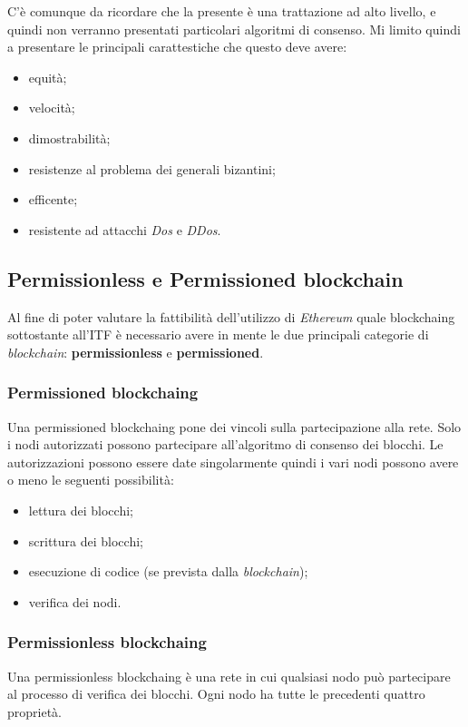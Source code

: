 C'è comunque da ricordare che la presente è una trattazione ad alto livello, e quindi non verranno presentati particolari algoritmi di consenso. Mi limito quindi a presentare le principali carattestiche che questo deve avere:
\begin{itemize}
    \item equità;
    \item velocità;
    \item dimostrabilità;
    \item resistenze al problema dei generali bizantini;
    \item efficente;
    \item resistente ad attacchi \emph{Dos} e \emph{DDos}.
\end{itemize}

\subsection{Permissionless e Permissioned blockchain}
Al fine di poter valutare la fattibilità dell’utilizzo di \emph{Ethereum} quale \gls{blockchaing} sottostante all’ITF è necessario avere in mente le due principali categorie di \emph{blockchain}: \textbf{permissionless} e \textbf{permissioned}.

\subsubsection{Permissioned \gls{blockchaing}}
Una permissioned \gls{blockchaing} pone dei vincoli sulla partecipazione alla rete. Solo i nodi autorizzati possono partecipare all’algoritmo di consenso dei blocchi. Le autorizzazioni possono essere date singolarmente quindi i vari nodi possono avere o meno le seguenti possibilità:
\begin{itemize}
    \item lettura dei blocchi;
    \item scrittura dei blocchi;
    \item esecuzione di codice (se prevista dalla \emph{blockchain});
    \item verifica dei nodi.
\end{itemize}

\subsubsection{Permissionless blockchaing}
Una permissionless \gls{blockchaing} è una rete in cui qualsiasi nodo può partecipare al processo di verifica dei blocchi. Ogni nodo ha tutte le precedenti quattro proprietà.

